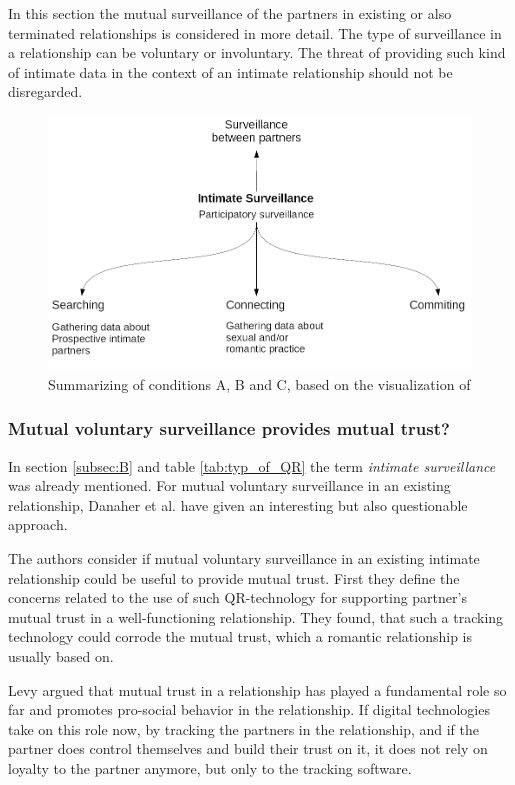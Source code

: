 In this section the mutual surveillance of the partners in existing or also terminated relationships is considered in more detail. 
The type of surveillance in a relationship can be voluntary or involuntary. The threat of providing such kind of intimate data in the context of an intimate relationship should not be disregarded.
\begin{figure}[htb]
	\centering
	\includegraphics[width=\linewidth]{img/summarizing.png}
	\caption{Summarizing of conditions A, B and C, based on the visualization of \cite{ethicsOfSurveillance}}
	\label{fig:intimate_surveillance}
\end{figure}

\subsubsection{Mutual voluntary surveillance provides mutual trust?}
In section \ref{subsec:B} and table \ref{tab:typ_of_QR} the term \textit{intimate surveillance} was already mentioned.
For mutual voluntary surveillance in an existing relationship, Danaher et al. \cite{doi:10.1080/15265161.2017.1409823} have given an interesting but also questionable approach.

The authors consider if mutual voluntary surveillance in an existing intimate relationship could be useful to provide mutual trust.
First they define the concerns related to the use of such \acs{QR}-technology for supporting partner's mutual trust in a well-functioning relationship. They found, that such a tracking technology could corrode the mutual trust, which a romantic relationship is usually based on.

Levy \cite{levy2014intimate} argued that mutual trust in a relationship has played a fundamental role so far and promotes pro-social behavior in the relationship. If digital technologies take on this role now, by tracking the partners in the relationship, and if the partner does control themselves and build their trust on it, it does not rely on loyalty to the partner anymore, but only to the tracking software.

